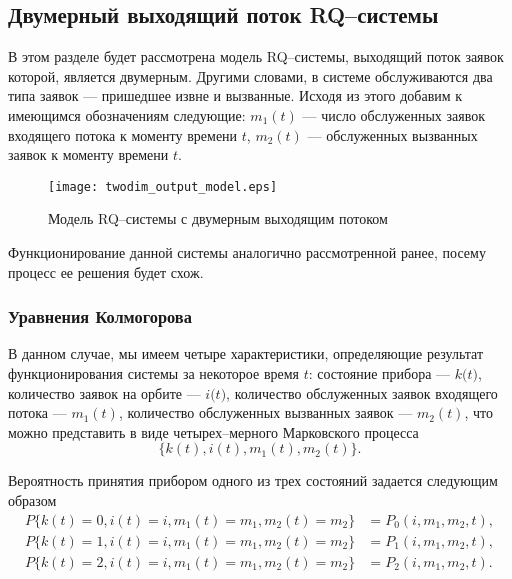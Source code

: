 \subsection{Двумерный выходящий поток RQ--системы} \label{section_simple_twodim}
В этом разделе будет рассмотрена модель RQ--системы, выходящий поток заявок которой, является двумерным. Другими словами, в системе обслуживаются два типа заявок --- пришедшее извне и вызванные. Исходя из этого добавим к имеющимся обозначениям следующие: \textit{$m_{1}(t)$} --- число обслуженных заявок входящего потока к моменту времени $\textit{t}$, \textit{$m_{2}(t)$} — обслуженных вызванных заявок к моменту времени $\textit{t}$.
\begin{figure}[H]
	\centering
	\texttt{[image: twodim\_output\_model.eps]}
	\caption{Модель RQ--системы с двумерным выходящим потоком}
	\label{twodim_output_model_fig}
\end{figure}
Функционирование данной системы аналогично рассмотренной ранее, посему процесс ее решения будет схож. 
\subsubsection{Уравнения Колмогорова}
В данном случае, мы имеем четыре характеристики, определяющие результат функционирования системы за некоторое время $t$: состояние прибора --- $\textit{k(t)}$, количество заявок на орбите --- $\textit{i(t)}$, количество обслуженных заявок входящего потока --- $m_{1}(t)$, количество обслуженных вызванных заявок --- $m_{2}(t)$,  что можно представить в виде четырех--мерного Марковского процесса
\begin{equation*}
	\{k(t),i(t),m_{1}(t),m_{2}(t)\}.
\end{equation*}

Вероятность принятия прибором одного из трех состояний задается следующим образом
\begin{equation*}
	\begin{split}
		P\{k(t)=0,i(t)=i,m_{1}(t)=m_{1},m_{2}(t)=m_{2}\} &=P_{0}(i,m_{1},m_{2},t),\\
		P\{k(t)=1,i(t)=i,m_{1}(t)=m_{1},m_{2}(t)=m_{2}\} &=P_{1}(i,m_{1},m_{2},t),\\
		P\{k(t)=2,i(t)=i,m_{1}(t)=m_{1},m_{2}(t)=m_{2}\} &=P_{2}(i,m_{1},m_{2},t).
	\end{split}
\end{equation*}

